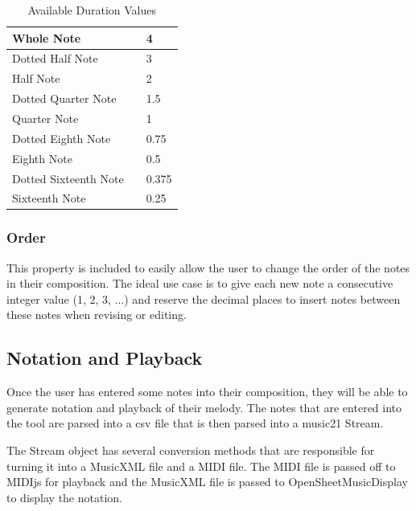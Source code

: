 \begin{table}[!htbp]
	\centering
	\caption{Available Duration Values}
	\begin{tabular}{|l|l|l|}
		\hline
		Whole Note & \musWhole & 4 \\ \hline
		Dotted Half Note & \musHalfDotted & 3 \\ \hline
		Half Note & \musHalf & 2 \\ \hline
		Dotted Quarter Note & \musQuarterDotted & 1.5 \\ \hline
		Quarter Note & \musQuarter & 1 \\ \hline
		Dotted Eighth Note & \musEighthDotted & 0.75 \\ \hline
		Eighth Note & \musEighth & 0.5 \\ \hline
		Dotted Sixteenth Note & \musSixteenthDotted & 0.375 \\ \hline
		Sixteenth Note & \musSixteenth & 0.25 \\ \hline
	\end{tabular}
\end{table}

\subsubsection{Order}
\label{subsubsec:Order}

This property is included to easily allow the user to change the order of the notes in their composition.  The ideal use case is to give each new note a consecutive integer value (1, 2, 3, ...) and reserve the decimal places to insert notes between these notes when revising or editing.

\subsection{Notation and Playback}
\label{subsec:notationandplayback}

Once the user has entered some notes into their composition, they will be able to generate notation and playback of their melody.  The notes that are entered into the tool are parsed into a csv file that is then parsed into a music21 Stream.

\vspace{\baselineskip}

The Stream object has several conversion methods that are responsible for turning it into a MusicXML file and a MIDI file.  The MIDI file is passed off to MIDIjs for playback and the MusicXML file is passed to OpenSheetMusicDisplay to display the notation.

